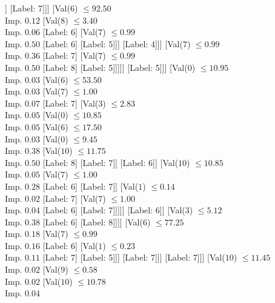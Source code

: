 \documentclass[margin=10pt]{standalone}
\begin{document}
\begin{forest}
											[Label: 7]
											[Label: 6]]
										[Label: 7]]]
								[Val($6$) $ \leq 92.50$ \\ Imp. $0.12$
									[Val($8$) $ \leq 3.40$ \\ Imp. $0.06$
										[Label: 6]
										[Val($7$) $ \leq 0.99$ \\ Imp. $0.50$
											[Label: 6]
											[Label: 5]]]
									[Label: 4]]]
							[Val($7$) $ \leq 0.99$ \\ Imp. $0.36$
								[Label: 7]
								[Val($7$) $ \leq 0.99$ \\ Imp. $0.50$
									[Label: 8]
									[Label: 5]]]]]
					[Label: 5]]]
			[Val($0$) $ \leq 10.95$ \\ Imp. $0.03$
				[Val($6$) $ \leq 53.50$ \\ Imp. $0.03$
					[Val($7$) $ \leq 1.00$ \\ Imp. $0.07$
						[Label: 7]
						[Val($3$) $ \leq 2.83$ \\ Imp. $0.05$
							[Val($0$) $ \leq 10.85$ \\ Imp. $0.05$
								[Val($6$) $ \leq 17.50$ \\ Imp. $0.03$
									[Val($0$) $ \leq 9.45$ \\ Imp. $0.38$
										[Val($10$) $ \leq 11.75$ \\ Imp. $0.50$
											[Label: 8]
											[Label: 7]]
										[Label: 6]]
									[Val($10$) $ \leq 10.85$ \\ Imp. $0.05$
										[Val($7$) $ \leq 1.00$ \\ Imp. $0.28$
											[Label: 6]
											[Label: 7]]
										[Val($1$) $ \leq 0.14$ \\ Imp. $0.02$
											[Label: 7]
											[Val($7$) $ \leq 1.00$ \\ Imp. $0.04$
												[Label: 6]
												[Label: 7]]]]]
								[Label: 6]]
							[Val($3$) $ \leq 5.12$ \\ Imp. $0.38$
								[Label: 6]
								[Label: 8]]]]
					[Val($6$) $ \leq 77.25$ \\ Imp. $0.18$
						[Val($7$) $ \leq 0.99$ \\ Imp. $0.16$
							[Label: 6]
							[Val($1$) $ \leq 0.23$ \\ Imp. $0.11$
								[Label: 7]
								[Label: 5]]]
						[Label: 7]]]
				[Label: 7]]]
		[Val($10$) $ \leq 11.45$ \\ Imp. $0.02$
			[Val($9$) $ \leq 0.58$ \\ Imp. $0.02$
				[Val($10$) $ \leq 10.78$ \\ Imp. $0.04$

\end{forest}
\end{document}
